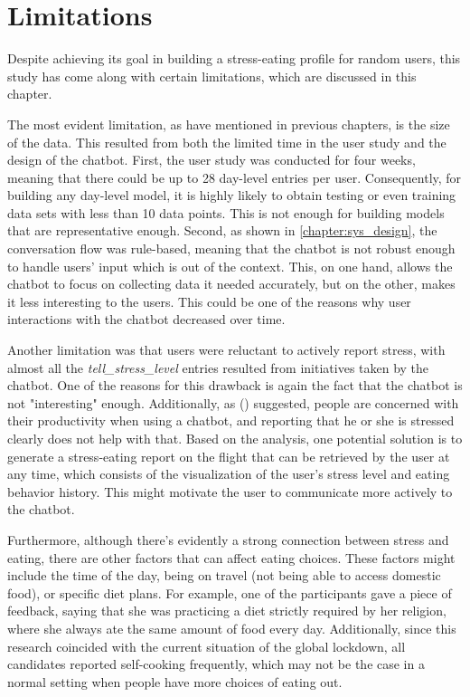 
\chapter{Limitations}\label{chapter:limitations}
Despite achieving its goal in building a stress-eating profile for random users, this study has come along with certain limitations, which are discussed in this chapter.\bigskip

\noindent The most evident limitation, as have mentioned in previous chapters, is the size of the data. This resulted from both the limited time in the user study and the design of the chatbot. First, the user study was conducted for four weeks, meaning that there could be up to 28 day-level entries per user. Consequently, for building any day-level model, it is highly likely to obtain testing or even training data sets with less than 10 data points. This is not enough for building models that are representative enough. Second, as shown in \autoref{chapter:sys_design}, the conversation flow was rule-based, meaning that the chatbot is not robust enough to handle users' input which is out of the context. This, on one hand, allows the chatbot to focus on collecting data it needed accurately, but on the other, makes it less interesting to the users. This could be one of the reasons why user interactions with the chatbot decreased over time.

Another limitation was that users were reluctant to actively report stress, with almost all the \emph{tell\_stress\_level} entries resulted from initiatives taken by the chatbot. One of the reasons for this drawback is again the fact that the chatbot is not "interesting" enough. Additionally, as \citeauthor{48_why_chatbot} (\citeyear{48_why_chatbot}) suggested, people are concerned with their productivity when using a chatbot, and reporting that he or she is stressed clearly does not help with that. Based on the analysis, one potential solution is to generate a stress-eating report on the flight that can be retrieved by the user at any time, which consists of the visualization of the user's stress level and eating behavior history. This might motivate the user to communicate more actively to the chatbot.

Furthermore, although there's evidently a strong connection between stress and eating, there are other factors that can affect eating choices. These factors might include the time of the day, being on travel (not being able to access domestic food), or specific diet plans. For example, one of the participants gave a piece of feedback, saying that she was practicing a diet strictly required by her religion, where she always ate the same amount of food every day. Additionally, since this research coincided with the current situation of the global lockdown, all candidates reported self-cooking frequently, which may not be the case in a normal setting when people have more choices of eating out.
